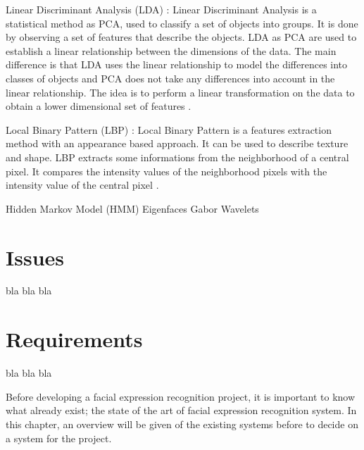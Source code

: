 \noindent Linear Discriminant Analysis (LDA) : Linear Discriminant Analysis is a statistical method as PCA, used to classify a set of objects into groups. It is done by observing a set of features that describe the objects. LDA as PCA are used to establish a linear relationship between the dimensions of the data. The main difference is that LDA uses the linear relationship to model the differences into classes of objects and PCA does not take any differences into account in the linear relationship. The idea is to perform a linear transformation on the data to obtain a lower dimensional set of features \cite{GAN08}.
\newline

\noindent Local Binary Pattern (LBP) : Local Binary Pattern is a features extraction method with an appearance based approach. It can be used to describe texture and shape. LBP extracts some informations from the neighborhood of a central pixel. It compares the intensity values of the neighborhood pixels with the intensity value of the central pixel  \cite{GAN08}.
\newline

\noindent Hidden Markov Model (HMM)
\newline
\noindent Eigenfaces
\newline
\noindent Gabor Wavelets
\newline

\section{Issues}

\noindent bla bla bla
\newline

\section{Requirements}

\noindent bla bla bla
\newline









\noindent Before developing a facial expression recognition project, it is important to know what already exist; the state of the art of facial expression recognition system. In this chapter, an overview will be given of the existing systems before to decide on a system for the project.
\newline
